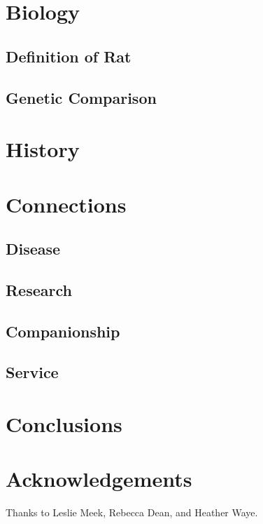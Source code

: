 \documentclass[12pt]{article}
\begin{document}
\section{Biology} \label{Biology}

\subsection{Definition of Rat} \label{Rat Definition}

\subsection{Genetic Comparison} \label{Genetic Comparison}

\section{History} \label{History}

\section{Connections} \label{Connections}

\subsection{Disease} \label{Disease}

\subsection{Research} \label{Research}

\subsection{Companionship} \label{Companionship}

\subsection{Service} \label{Service}

\section{Conclusions} \label{Conclusions}

\section{Acknowledgements}

Thanks to Leslie Meek, Rebecca Dean, and Heather Waye.

\pagebreak



\end{document}
